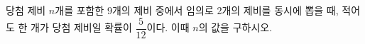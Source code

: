 당첨 제비 $n$개를 포함한 9개의 제비 중에서 임의로 2개의 제비를 동시에 뽑을 때, 적어도 한 개가 당첨 제비일 확률이 $\dfrac{5}{12}$이다. 이때 $n$의 값을 구하시오. 
